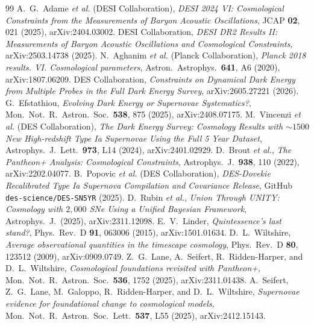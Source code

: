\documentclass[11pt,a4paper]{article}
\begin{document}
\begin{thebibliography}{99}
 A.~G.~Adame \textit{et al.} (DESI Collaboration), \textit{DESI 2024 VI: Cosmological Constraints from the Measurements of Baryon Acoustic Oscillations}, JCAP \textbf{02}, 021 (2025), arXiv:2404.03002.
 DESI Collaboration, \textit{DESI DR2 Results II: Measurements of Baryon Acoustic Oscillations and Cosmological Constraints}, arXiv:2503.14738 (2025).
 N.~Aghanim \textit{et al.} (Planck Collaboration), \textit{Planck 2018 results. VI. Cosmological parameters}, Astron.\ Astrophys.\ \textbf{641}, A6 (2020), arXiv:1807.06209.
 DES Collaboration, \textit{Constraints on Dynamical Dark Energy from Multiple Probes in the Full Dark Energy Survey}, arXiv:2605.27221 (2026).
 G.~Efstathiou, \textit{Evolving Dark Energy or Supernovae Systematics?}, Mon.\ Not.\ R.\ Astron.\ Soc.\ \textbf{538}, 875 (2025), arXiv:2408.07175.
 M.~Vincenzi \textit{et al.} (DES Collaboration), \textit{The Dark Energy Survey: Cosmology Results with $\sim 1500$ New High-redshift Type Ia Supernovae Using the Full 5 Year Dataset}, Astrophys.\ J.\ Lett.\ \textbf{973}, L14 (2024), arXiv:2401.02929.
 D.~Brout \textit{et al.}, \textit{The Pantheon+ Analysis: Cosmological Constraints}, Astrophys.\ J.\ \textbf{938}, 110 (2022), arXiv:2202.04077.
 B.~Popovic \textit{et al.} (DES Collaboration), \textit{DES-Dovekie Recalibrated Type Ia Supernova Compilation and Covariance Release}, GitHub \texttt{des-science/DES-SN5YR} (2025).
 D.~Rubin \textit{et al.}, \textit{Union Through UNITY: Cosmology with $2,000$ SNe Using a Unified Bayesian Framework}, Astrophys.\ J.\ (2025), arXiv:2311.12098.
 E.~V.~Linder, \textit{Quintessence's last stand?}, Phys.\ Rev.\ D \textbf{91}, 063006 (2015), arXiv:1501.01634.
 D.~L.~Wiltshire, \textit{Average observational quantities in the timescape cosmology}, Phys.\ Rev.\ D \textbf{80}, 123512 (2009), arXiv:0909.0749.
 Z.~G.~Lane, A.~Seifert, R.~Ridden-Harper, and D.~L.~Wiltshire, \textit{Cosmological foundations revisited with Pantheon+}, Mon.\ Not.\ R.\ Astron.\ Soc.\ \textbf{536}, 1752 (2025), arXiv:2311.01438.
 A.~Seifert, Z.~G.~Lane, M.~Galoppo, R.~Ridden-Harper, and D.~L.~Wiltshire, \textit{Supernovae evidence for foundational change to cosmological models}, Mon.\ Not.\ R.\ Astron.\ Soc.\ Lett.\ \textbf{537}, L55 (2025), arXiv:2412.15143.

\end{thebibliography}
\end{document}
